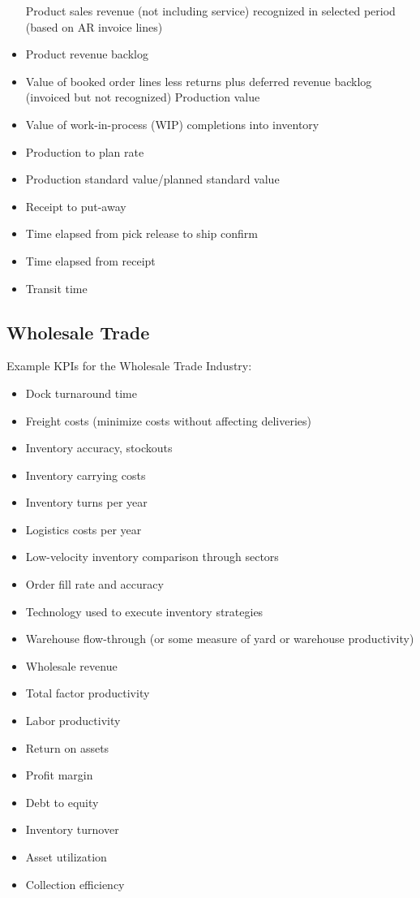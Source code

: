 \documentclass[]{book}
\providecommand{\tightlist}{%
  \setlength{\itemsep}{0pt}\setlength{\parskip}{0pt}}
\begin{document}
\begin{itemize}
  Product sales revenue (not including service) recognized in selected
  period (based on AR invoice lines)
\item
  Product revenue backlog
\item
  Value of booked order lines less returns plus deferred revenue backlog
  (invoiced but not recognized) Production value
\item
  Value of work-in-process (WIP) completions into inventory
\item
  Production to plan rate
\item
  Production standard value/planned standard value
\item
  Receipt to put-away
\item
  Time elapsed from pick release to ship confirm
\item
  Time elapsed from receipt
\item
  Transit time
\end{itemize}

\subsection{Wholesale Trade}\label{wholesale-trade}

Example KPIs for the Wholesale Trade Industry:

\begin{itemize}
\tightlist
\item
  Dock turnaround time
\item
  Freight costs (minimize costs without affecting deliveries)
\item
  Inventory accuracy, stockouts
\item
  Inventory carrying costs
\item
  Inventory turns per year
\item
  Logistics costs per year
\item
  Low-velocity inventory comparison through sectors
\item
  Order fill rate and accuracy
\item
  Technology used to execute inventory strategies
\item
  Warehouse flow-through (or some measure of yard or warehouse
  productivity)
\item
  Wholesale revenue
\item
  Total factor productivity
\item
  Labor productivity
\item
  Return on assets
\item
  Profit margin
\item
  Debt to equity
\item
  Inventory turnover
\item
  Asset utilization
\item
  Collection efficiency
\end{itemize}
\end{document}
